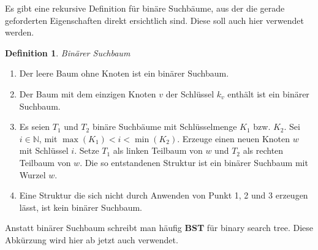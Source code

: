 \documentclass[a4paper,12pt]{article}
\begin{document}
\noindent Es gibt eine rekursive Definition für binäre Suchbäume, aus der die gerade geforderten Eigenschaften direkt ersichtlich sind.
Diese soll auch hier verwendet werden.\\ 


\newtheorem{defi}{Definition}[section]
\begin{defi}Binärer Suchbaum\end{defi}
\begin{enumerate}
	\item Der leere Baum ohne Knoten ist ein binärer Suchbaum.
	\item Der Baum mit dem einzigen Knoten $v$ der Schlüssel $k_v$ enthält ist ein binärer Suchbaum.
	\item Es seien $T_1$ und $T_2$ binäre Suchbäume mit Schlüsselmenge $K_1$ bzw. $K_2$. Sei $i \in \mathbb{N} $, mit $\max{(K_1)} < i < \min{(K_2)}$. Erzeuge einen neuen Knoten $w$ mit Schlüssel $i$. Setze $T_1$ als linken Teilbaum von $w$ und $T_2$ als rechten Teilbaum von $w$. Die so entstandenen Struktur ist ein binärer Suchbaum mit Wurzel $w$. 
	\item Eine Struktur die sich nicht durch Anwenden von Punkt 1, 2 und 3 erzeugen lässt, ist kein binärer Suchbaum.  
\end{enumerate}
	
\noindent Anstatt binärer Suchbaum schreibt man häufig \textbf{BST} für binary search tree. Diese Abkürzung wird hier ab jetzt auch verwendet. 	
\end{document}
